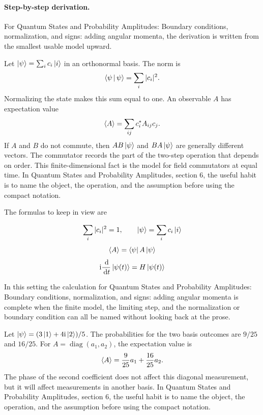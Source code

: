 \paragraph{Step-by-step derivation.}

For Quantum States and Probability Amplitudes: Boundary conditions, normalization, and signs: adding angular momenta, the derivation is written from the smallest usable model upward.

Let \(\left|\psi\right\rangle=\sum_i c_i\left|i\right\rangle\) in an orthonormal basis.  The norm is
\[
  \left\langle \psi\,\middle|\,\psi\right\rangle=\sum_i |c_i|^2.
\]
Normalizing the state makes this sum equal to one.  An observable \(A\) has expectation value
\[
  \left\langle A\right\rangle=\sum_{ij}c_i^*A_{ij}c_j.
\]
If \(A\) and \(B\) do not commute, then \(AB\left|\psi\right\rangle\) and \(BA\left|\psi\right\rangle\) are generally different vectors.  The commutator records the part of the two-step operation that depends on order.  This finite-dimensional fact is the model for field commutators at equal time.  In Quantum States and Probability Amplitudes, section 6, the useful habit is to name the object, the operation, and the assumption before using the compact notation.

The formulas to keep in view are

\[
  \sum_i |c_i|^2=1,\qquad \left|\psi\right\rangle=\sum_i c_i\left|i\right\rangle
\]
\[
  \left\langle A\right\rangle=\left\langle \psi\right|A\left|\psi\right\rangle
\]
\[
  \mathrm i\frac{\,\mathrm d}{\,\mathrm d t}\left|\psi(t)\right\rangle=H\left|\psi(t)\right\rangle
\]

In this setting the calculation for Quantum States and Probability Amplitudes: Boundary conditions, normalization, and signs: adding angular momenta is complete when the finite model, the limiting step, and the normalization or boundary condition can all be named without looking back at the prose.




\begin{example}
Let \(\left|\psi\right\rangle=(3\left|1\right\rangle+4\mathrm i\left|2\right\rangle)/5\).  The probabilities for the two basis outcomes are \(9/25\) and \(16/25\).  For \(A=\operatorname{diag}(a_1,a_2)\), the expectation value is
\[
  \left\langle A\right\rangle=\frac{9}{25}a_1+\frac{16}{25}a_2.
\]
The phase of the second coefficient does not affect this diagonal measurement, but it will affect measurements in another basis.  In Quantum States and Probability Amplitudes, section 6, the useful habit is to name the object, the operation, and the assumption before using the compact notation.
\end{example}



